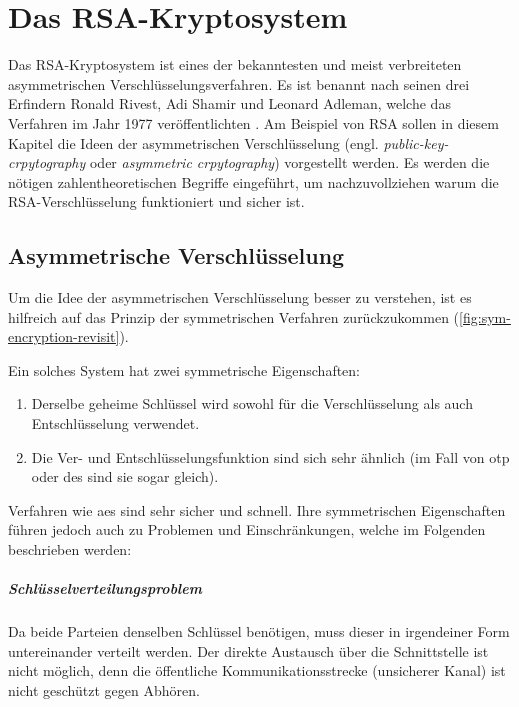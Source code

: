 \chapter{Das RSA-Kryptosystem} \label{cha:rsa}
Das RSA-Kryptosystem ist eines der bekanntesten und meist
verbreiteten asymmetrischen Verschlüsselungsverfahren. Es ist benannt nach
seinen drei Erfindern Ronald Rivest, Adi Shamir und Leonard Adleman, welche das Verfahren
im Jahr 1977 veröffentli\-chten \parencite[173]{BOOK:crypto}.
Am Beispiel von RSA sollen in diesem Kapitel die
Ideen der asymmetrischen Verschlüsselung
(engl. \textit{public-key-crpytography} oder \textit{asymmetric crpytography})
vorgestellt werden. Es werden die nötigen
zahlentheoretischen Begriffe eingeführt, um nachzuvollziehen
warum die RSA-Verschlüsselung funktioniert und sicher ist.

\section{Asymmetrische Verschlüsselung}
Um die Idee der asymmetrischen Verschlüsselung besser zu verstehen,
ist es hilfreich auf das Prinzip der symmetrischen Verfahren zurückzukommen
(\autoref{fig:sym-encryption-revisit}).



\noindent
Ein solches System hat zwei symmetrische Eigenschaften:
\begin{enumerate}
  \item Derselbe geheime Schlüssel wird sowohl für die
        Verschlüsselung als auch Entschlüs\-selung verwendet.
  \item Die Ver- und Entschlüsselungsfunktion sind sich sehr ähnlich
        (im Fall von \acs{otp} oder \acs{des} sind sie sogar gleich).
\end{enumerate}
Verfahren wie \acs{aes} sind sehr sicher und schnell.
Ihre symmetrischen Eigenschaften führen jedoch auch zu Problemen
und Einschränkungen,
welche im Folgenden beschrieben werden:

\paragraph{Schlüsselverteilungsproblem}
Da beide Parteien denselben Schlüssel benötigen, muss dieser in
irgendeiner Form untereinander verteilt werden.
Der direkte Austausch über die Schnittstelle ist nicht möglich, denn
die öffentliche Kommunikationsstrecke (unsicherer Kanal) ist nicht geschützt gegen Abhören.

